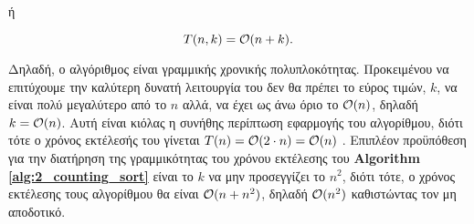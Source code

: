 \begin{center}
	ή
	\vspace*{-14pt}
\end{center}

\begin{equation}
	\label{eq:counting_sort_O(n+k)}
	T(n,k)=\mathcal{O}(n+k).
\end{equation}

Δηλαδή, ο αλγόριθμος είναι γραμμικής χρονικής πολυπλοκότητας. Προκειμένου να επιτύχουμε την καλύτερη δυνατή λειτουργία του δεν θα πρέπει το εύρος τιμών, $k$, να είναι πολύ μεγαλύτερο από το $n$ αλλά, να έχει ως άνω όριο το $\mathcal{O}(n)$, δηλαδή $k = \mathcal{O}(n)$. Αυτή είναι κιόλας η συνήθης περίπτωση εφαρμογής του αλγορίθμου, διότι τότε ο χρόνος εκτέλεσής του γίνεται $T(n)=\mathcal{O}(2\cdot n)=\mathcal{O}(n)$ . Επιπλέον προϋπόθεση για την διατήρηση της γραμμικότητας του χρόνου εκτέλεσης του \textbf{Algorithm \ref{alg:2_counting_sort}} είναι το $k$ να μην προσεγγίζει το $n^{2}$, διότι τότε, ο χρόνος εκτέλεσης τους αλγορίθμου θα είναι $\mathcal{O}(n+n^2)$, δηλαδή $\mathcal{O}(n^2)$ καθιστώντας τον μη αποδοτικό.